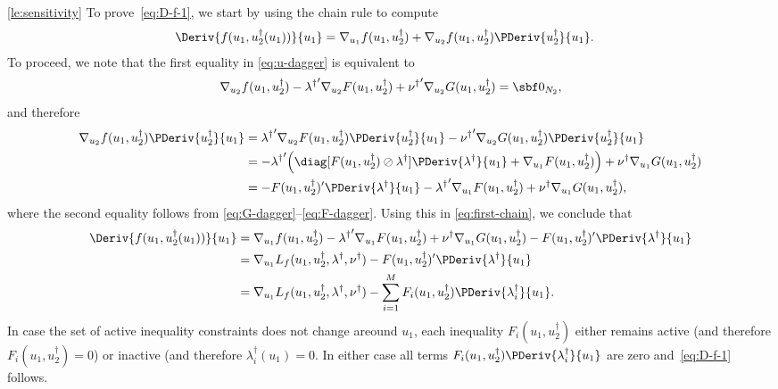 \documentclass[11pt]{article}
\begin{document}
\begin{proof-lemma}{\ref{le:sensitivity}}
  To prove~\eqref{eq:D-f-1}, we start by using the chain rule to
  compute
  \begin{align}\label{eq:first-chain}
    \Deriv{f(u_1,u_2^\dagger(u_1))}{u_1}
    &=\nabla_{u_1} f(u_1,u_2^\dagger)+\nabla_{u_2} f(u_1,u_2^\dagger)\PDeriv{u_2^\dagger}{u_1}.
  \end{align}
  To proceed, we note that the first equality in \eqref{eq:u-dagger}
  is equivalent to
  \begin{align*}
    \nabla_{u_2} f(u_1,u_2^\dagger)-{\lambda^\dagger}'\nabla_{u_2} F(u_1,u_2^\dagger)+{\nu^\dagger}'\nabla_{u_2}G(u_1,u_2^\dagger)=\sbf 0_{N_2},
  \end{align*}
  and therefore
  \begin{align*}
    \nabla_{u_2} f(u_1,u_2^\dagger)\PDeriv{u_2^\dagger}{u_1}
    &={\lambda^\dagger}'\nabla_{u_2} F(u_1,u_2^\dagger)\PDeriv{u_2^\dagger}{u_1}
    -{\nu^\dagger}'\nabla_{u_2}G(u_1,u_2^\dagger)\PDeriv{u_2^\dagger}{u_1}\\
    &=-{\lambda^\dagger}'\Big(\diag[F(u_1,u_2^\dagger)\oslash\lambda^\dagger]\PDeriv{\lambda^\dagger}{u_1}
    +\nabla_{u_1} F(u_1,u_2^\dagger)\Big)
    +{\nu^\dagger}\nabla_{u_1} G(u_1,u_2^\dagger)\\
    &=-F(u_1,u_2^\dagger)'\PDeriv{\lambda^\dagger}{u_1}
    -{\lambda^\dagger}'\nabla_{u_1} F(u_1,u_2^\dagger)
    +{\nu^\dagger}\nabla_{u_1} G(u_1,u_2^\dagger),
  \end{align*}
  where the second equality follows from
  \eqref{eq:G-dagger}--\eqref{eq:F-dagger}.
  Using this in \eqref{eq:first-chain}, we conclude that
  \begin{align*}
    \Deriv{f(u_1,u_2^\dagger(u_1))}{u_1}
    &=\nabla_{u_1} f(u_1,u_2^\dagger)
    -{\lambda^\dagger}' \nabla_{u_1} F(u_1,u_2^\dagger)
    +{\nu^\dagger}\nabla_{u_1} G(u_1,u_2^\dagger)
    -F(u_1,u_2^\dagger)'\PDeriv{\lambda^\dagger}{u_1}\\
    &=\nabla_{u_1}L_f(u_1,u_2^\dagger,\lambda^\dagger,\nu^\dagger)
    -F(u_1,u_2^\dagger)'\PDeriv{\lambda^\dagger}{u_1}\\
    &=\nabla_{u_1}L_f(u_1,u_2^\dagger,\lambda^\dagger,\nu^\dagger)
    -\sum_{i=1}^MF_i(u_1,u_2^\dagger)\PDeriv{\lambda_i^\dagger}{u_1}.
  \end{align*}
  In case the set of active inequality constraints does not change
  areound $u_1$, each inequality $F_i(u_1,u_2^\dagger)$ either remains
  active (and therefore $F_i(u_1,u_2^\dagger)=0$) or inactive (and
  therefore $\lambda_i^\dagger(u_1)=0$. In either case all terms
  $F_i(u_1,u_2^\dagger)\PDeriv{\lambda_i^\dagger}{u_1}$ are zero
  and~\eqref{eq:D-f-1} follows.


\end{proof-lemma}
\end{document}
